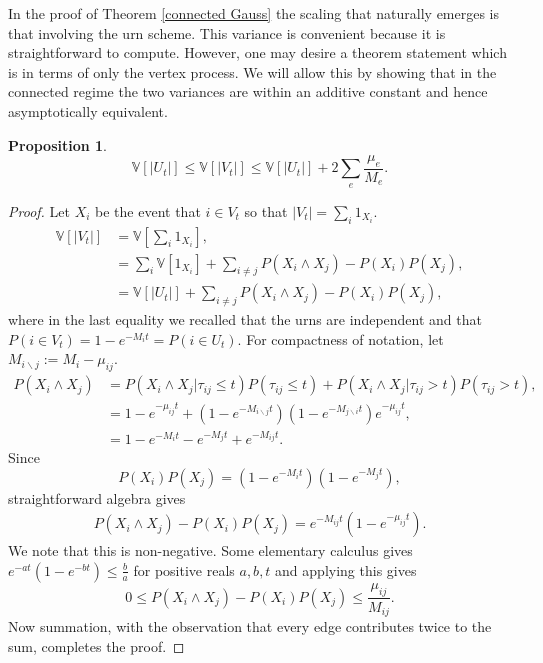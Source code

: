 \documentclass[12pt]{article}
\newtheorem{proposition}{Proposition}
\theoremstyle{definition}
\begin{document}
In the proof of Theorem \ref{connected Gauss} the scaling that naturally emerges is that involving the urn scheme. This variance is convenient because it is straightforward to compute. However, one may desire a theorem statement which is in terms of only the vertex process. We will allow this by showing that in the connected regime the two variances are within an additive constant and hence asymptotically equivalent.

\begin{proposition}\label{equi var ineq}
$$\mathbb{V}[|U_t|] \leq \mathbb{V}[|V_t|] \leq \mathbb{V}[|U_t|]+2\sum_{e}\frac{\mu_e}{M_e}.$$ 
\end{proposition}
\begin{proof}  Let $X_i$ be the event that $i \in V_t$ so that $|V_t|=\sum_i 1_{X_i}$. 
    \begin{align*}
        \mathbb{V}[|V_t|] &= \mathbb{V}\left[\sum_{i}1_{X_i}\right], \\
        &= \sum_i \mathbb{V}[1_{X_i}] + \sum_{i \neq j}P(X_i \wedge X_j)-P(X_i)P(X_j), \\
        &= \mathbb{V}[|U_t|]+\sum_{i \neq j}P(X_i \wedge X_j)-P(X_i)P(X_j),
    \end{align*} 
    where in the last equality we recalled that the urns are independent and that $P(i \in V_t) = 1-e^{-M_it}= P(i \in U_t)$.
For compactness of notation, let $M_{i \backslash j} := M_{i}-\mu_{ij}$.
\begin{align*}
    P(X_i \wedge X_j) &= P(X_i \wedge X_j|\tau_{ij} \leq t)P(\tau_{ij} \leq t)+P(X_i \wedge X_j | \tau_{ij} > t)P(\tau_{ij} > t), \\
    &= 1-e^{-\mu_{ij}t}+(1-e^{-M_{i \backslash j}t})(1-e^{-M_{j\backslash i}t})e^{-\mu_{ij}t}, \\
    &= 1-e^{-M_it}-e^{-M_jt}+e^{-M_{ij}t}.
\end{align*}
Since $$P(X_i)P(X_j) = (1-e^{-M_it})(1-e^{-M_jt}),$$ straightforward algebra gives \begin{align*}
    P(X_i \wedge X_j)-P(X_i)P(X_j) = e^{-M_{ij}t}(1-e^{-\mu_{ij}t}).
\end{align*} We note that this is non-negative. Some elementary calculus gives $e^{-at}(1-e^{-bt}) \leq \frac{b}{a}$ for positive reals $a,b,t$ and applying this gives
$$0 \leq P(X_i \wedge X_j)-P(X_i)P(X_j) \leq \frac{\mu_{ij}}{M_{ij}}.$$ Now summation, with the observation that every edge contributes twice to the sum, completes the proof.
\end{proof}
\end{document}
